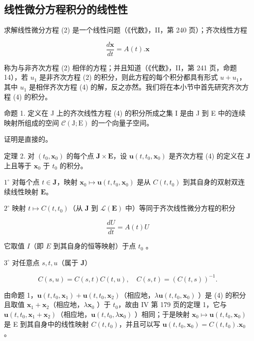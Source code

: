 \subsection{线性微分方程积分的线性性}

求解线性微分方程 (2) 是一个线性问题（《代数》，II，第 240 页）；齐次线性方程

\[
{\frac {d \mathbf {x}}{d t}} = A (t). \mathbf {x}\tag{4}
\]

称为与非齐次方程 (2) 相伴的方程；并且知道（《代数》，II，第 241 页，命题 14），若 \(u_{1}\) 是非齐次方程 (2) 的积分，则此方程的每个积分都具有形式 \(u + u_{1}\)，其中 \(u_{1}\) 是相伴齐次方程 (4) 的解，反之亦然。我们将在本小节中首先研究齐次方程 (4) 的积分。

命题 1. 定义在 J 上的齐次线性方程 (4) 的积分所成之集 I 是由 J 到 E 中的连续映射所组成的空间 \(\mathcal{C}(\mathrm{J};\mathrm{E})\) 的一个向量子空间。

证明是直接的。

定理 2. 对 \((t_0, \mathbf{x}_0)\) 的每个点 \(\mathbf{J} \times \mathbf{E}\)，设 \(\mathbf{u}(t, t_0, \mathbf{x}_0)\) 是齐次方程 (4) 的定义在 \(\mathbf{J}\) 上且等于 \(\mathbf{x}_0\) 于 \(t_0\) 的积分。

\(1^{\circ}\) 对每个点 \(t \in \mathbf{J}\)，映射 \(\mathbf{x}_0 \mapsto \mathbf{u}(t, t_0, \mathbf{x}_0)\) 是从 \(C(t, t_0)\) 到其自身的双射双连续线性映射 \(\mathbf{E}\)。

\(2^{\circ}\) 映射 \(t \mapsto C(t, t_0)\)（从 \(\mathbf{J}\) 到 \(\mathcal{L}(\mathbf{E})\) 中）等同于齐次线性微分方程的积分

\[
\frac {d U}{d t} = A (t) U\tag{5}
\]

它取值 \(I\)（即 \(E\) 到其自身的恒等映射）于点 \(t_0\) 。

\(3^{\circ}\) 对任意点 \(s, t, u\)（属于 \(\mathbf{J}\)）

\[
C (s, u) = C (s, t) C (t, u), \quad C (s, t) = (C (t, s)) ^ {- 1}.\tag{6}
\]

由命题 1，\(\mathbf{u}(t,t_0,\mathbf{x}_1) + \mathbf{u}(t,t_0,\mathbf{x}_2)\)（相应地，\(\lambda \mathbf{u}(t,t_0,\mathbf{x}_0)\) ）是 (4) 的积分且取值 \(\mathbf{x}_1 + \mathbf{x}_2\)（相应地，\(\lambda \mathbf{x}_0\) ）于 \(t_0\)，故由 IV 第 179 页的定理 1，它与 \(\mathbf{u}(t,t_0,\mathbf{x}_1 + \mathbf{x}_2)\)（相应地，\(\mathbf{u}(t,t_0,\lambda \mathbf{x}_0)\) ）相同；于是映射 \(\mathbf{x}_0\mapsto \mathbf{u}(t,t_0,\mathbf{x}_0)\) 是 E 到其自身中的线性映射 \(C(t,t_0)\)，并且可以写 \(\mathbf{u}(t,t_0,\mathbf{x}_0) = C(t,t_0).\mathbf{x}_0\) 。

